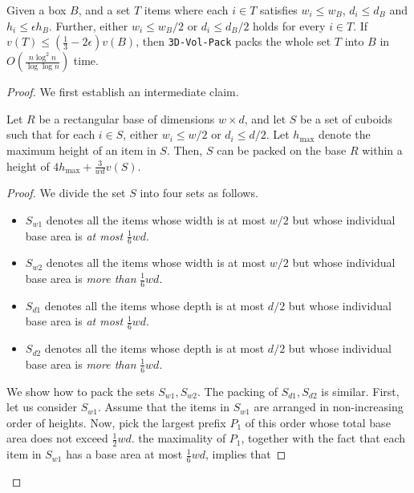 \begin{lemma}
\label{lem:steinberg}
    Given a box $B$, and a set $T$  items where each $i\in T$ satisfies $w_i \le w_B$, $d_i \le d_B$ and $h_i \le \epsilon h_B$. Further, either $w_i \le w_B/2$ 
    or $d_i \le d_B/2$ holds for every $i\in T$. If $v(T) \le \left(\frac{1}{3}-2\epsilon\right)v(B)$, then \texttt{3D-Vol-Pack} packs the whole set $T$ into $B$ in $O\left(\frac{n \log^2 n}{\log \log n}\right)$ time.
\end{lemma}
\begin{proof}
We first establish an intermediate claim.
\begin{claim}
    \label{lem:steinberg-layers-height}
    Let $R$ be a rectangular base of dimensions $w\times d$, and let $S$ be a set of cuboids such that for each $i\in S$, either $w_i \le w/2$ or $d_i \le d/2$. 
    Let $h_{\max}$ denote the maximum height of an item in $S$. Then, $S$ can be packed on the base $R$ within a height of $4 h_{\max}+\frac{3}{wd}v(S)$. 
\end{claim}
\begin{proof}
    We divide the set $S$ into four sets as follows.
    \begin{itemize}
        \item $S_{w1}$ denotes all the items whose width is at most $w/2$ but whose individual base area is {\em at most} $\frac16wd$.
        \item $S_{w2}$ denotes all the items whose width is at most $w/2$ but whose individual base area is {\em more than} $\frac16wd$.
        \item $S_{d1}$ denotes all the items whose depth is at most $d/2$ but whose individual base area is {\em at most} $\frac16wd$.
        \item $S_{d2}$ denotes all the items whose depth is at most $d/2$ but whose individual base area is {\em more than} $\frac16wd$.
    \end{itemize}
    We show how to pack the sets $S_{w1},S_{w2}$. The packing of $S_{d1},S_{d2}$ is similar. First, let us consider $S_{w1}$. 
    Assume that the items in $S_{w1}$ are arranged in non-increasing order of heights. Now, pick the largest prefix $P_1$
    of this order whose total base area does not exceed $\frac12wd$.
    the maximality of $P_1$, together with the fact that each item in $S_{w1}$ has a base area at most $\frac16wd$, implies that

\end{proof}
\end{proof}
